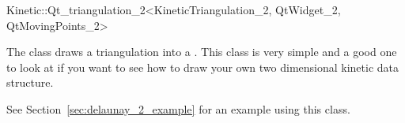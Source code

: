 

\begin{ccRefClass}{Kinetic::Qt_triangulation_2<KineticTriangulation_2, QtWidget_2, QtMovingPoints_2>}  %


\ccDefinition
  
The class draws a triangulation into a . This class is
very simple and a good one to look at if you want to see how to draw
your own two dimensional kinetic data structure.

See Section~\ref{sec:delaunay_2_example} for an example using this class. 


\ccCreation
{}  %


\ccSeeAlso


\end{ccRefClass}



